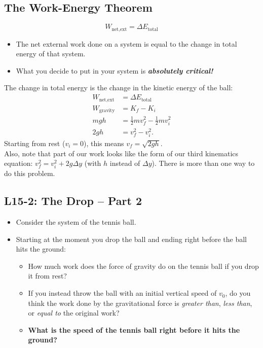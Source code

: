\documentclass[]{article}
\newcommand{\Week}{15}
\begin{document}
\newpage
\begin{TeacherMargin}

\end{TeacherMargin}
\begin{PresentSpace}
\vspace{-10pt}
\section*{The Work-Energy Theorem}
\vspace{-10pt}
\[
W_{\text{net,ext}} = \Delta E_{\text{total}}
\]
\begin{itemize}
	\item The net external work done on a system is equal to the change in total energy of that system.
	\item What you decide to put in your system is \textit{\textbf{absolutely critical!}}
\end{itemize}
\end{PresentSpace}
\newpage
\begin{TeacherMargin}
The change in total energy is the change in the kinetic energy of the ball:
\begin{align*}
	W_{\text{net,ext}} & = \Delta E_{\text{total}} \\
	W_{\text{gravity}} & = K_{f}-K_{i} \\
	mgh & = \frac{1}{2}mv_{f}^{2}-\frac{1}{2}mv_{i}^{2} \\
	2gh & = v_{f}^{2}-v_{i}^{2}.
\end{align*}
Starting from rest ($v_{i}=0$), this means $v_{f}=\sqrt{2gh}$. \\

\noindent Also, note that part of our work looks like the form of our third kinematics equation: $v_{f}^{2} = v_{i}^{2}+2g\Delta y$ (with $h$ instead of $\Delta y$). There is more than one way to do this problem.
\end{TeacherMargin}
\begin{PresentSpace}
\vspace{-10pt}
\section*{L\Week-2: The Drop -- Part 2}
\vspace{-10pt}
\begin{itemize}
	\item Consider the system of the tennis ball.
	\item Starting at the moment you drop the ball and ending right before the ball hits the ground:
	\begin{itemize}
		\item How much work does the force of gravity do on the tennis ball if you drop it from rest?
		\item If you instead throw the ball with an initial vertical speed of $v_{0}$, do you think the work done by the gravitational force is \textit{greater than}, \textit{less than}, or \textit{equal to} the original work?
		\item \textbf{What is the speed of the tennis ball right before it hits the ground?}
	\end{itemize}
\end{itemize}
\end{PresentSpace}
\end{document}
